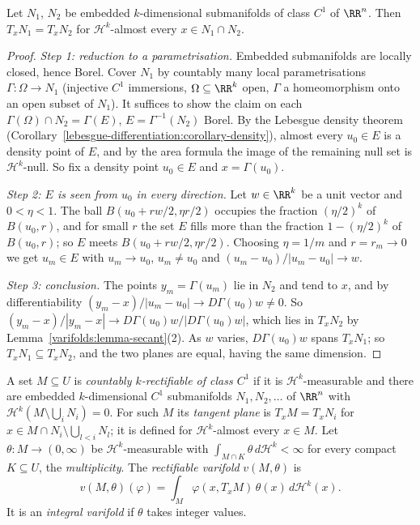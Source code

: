 \begin{lemma}\label{varifolds:lemma-tangent-agree}
Let $N_1$, $N_2$ be embedded $k$-dimensional submanifolds of class $C^1$ of $\RR^n$. Then $T_xN_1 = T_xN_2$ for $\mathcal{H}^k$-almost every $x \in N_1 \cap N_2$.
\end{lemma}

\begin{proof}
\emph{Step 1: reduction to a parametrisation.} Embedded submanifolds are locally closed, hence Borel. Cover $N_1$ by countably many local parametrisations $\Gamma \colon \Omega \to N_1$ (injective $C^1$
immersions, $\Omega \subseteq \RR^k$ open, $\Gamma$ a homeomorphism onto an open subset of $N_1$). It suffices to show the claim on each $\Gamma(\Omega) \cap N_2 = \Gamma(E)$, $E = \Gamma^{-1}(N_2)$ Borel. By the
Lebesgue density theorem (Corollary~\ref{lebesgue-differentiation:corollary-density}), almost every $u_0 \in E$ is a density point of $E$, and by the area formula the image of the remaining null set is
$\mathcal{H}^k$-null. So fix a density point $u_0 \in E$ and $x = \Gamma(u_0)$.

\emph{Step 2: $E$ is seen from $u_0$ in every direction.} Let $w \in \RR^k$ be a unit vector and $0 < \eta < 1$. The ball $B(u_0 + rw/2, \eta r/2)$ occupies the fraction $(\eta/2)^k$ of $B(u_0, r)$, and for small $r$
the set $E$ fills more than the fraction $1 - (\eta/2)^k$ of $B(u_0, r)$; so $E$ meets $B(u_0 + rw/2, \eta r/2)$. Choosing $\eta = 1/m$ and $r = r_m \to 0$ we get $u_m \in E$ with $u_m \to u_0$, $u_m \neq u_0$
and $(u_m - u_0)/|u_m - u_0| \to w$.

\emph{Step 3: conclusion.} The points $y_m = \Gamma(u_m)$ lie in $N_2$ and tend to $x$, and by differentiability $(y_m - x)/|u_m - u_0| \to D\Gamma(u_0)w \neq 0$. So
$(y_m - x)/|y_m - x| \to D\Gamma(u_0)w/|D\Gamma(u_0)w|$, which lies in $T_xN_2$ by Lemma~\ref{varifolds:lemma-secant}(2). As $w$ varies, $D\Gamma(u_0)w$ spans $T_xN_1$; so $T_xN_1 \subseteq T_xN_2$, and the
two planes are equal, having the same dimension.
\end{proof}

\begin{definition}\label{varifolds:definition-rectifiable-varifold}
A set $M \subseteq U$ is \emph{countably $k$-rectifiable of class $C^1$} if it is $\mathcal{H}^k$-measurable and there are embedded $k$-dimensional $C^1$ submanifolds $N_1, N_2, \ldots$ of $\RR^n$ with
$\mathcal{H}^k(M \setminus \bigcup_iN_i) = 0$. For such $M$ its \emph{tangent plane} is $T_xM = T_xN_i$ for $x \in M \cap N_i \setminus \bigcup_{l < i}N_l$; it is defined for $\mathcal{H}^k$-almost every
$x \in M$. Let $\theta \colon M \to (0, \infty)$ be $\mathcal{H}^k$-measurable with $\int_{M \cap K}\theta\,d\mathcal{H}^k < \infty$ for every compact $K \subseteq U$, the \emph{multiplicity}. The
\emph{rectifiable varifold} $v(M, \theta)$ is
\[
v(M, \theta)(\varphi) = \int_M\varphi(x, T_xM)\,\theta(x)\,d\mathcal{H}^k(x) .
\]
It is an \emph{integral varifold} if $\theta$ takes integer values.
\end{definition}

